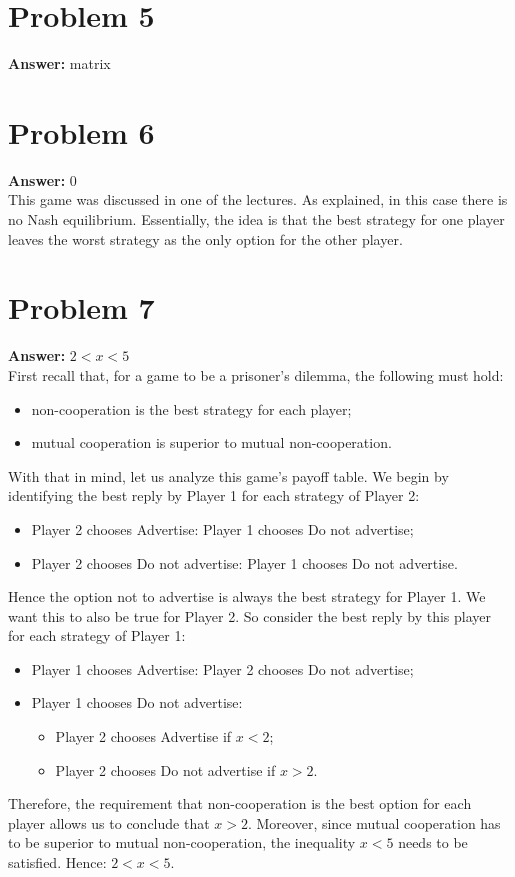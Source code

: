 \documentclass[11pt]{article}
\begin{document}
\section*{Problem 5}
\label{sec:org3917fc6}

\textbf{Answer:} matrix
\section*{Problem 6}
\label{sec:orgbb66c9e}

\textbf{Answer:} 0\\

This game was discussed in one of the lectures. As explained, in this case there
is no Nash equilibrium. Essentially, the idea is that the best strategy for one
player leaves the worst strategy as the only option for the other player.
\section*{Problem 7}
\label{sec:org84bb9a9}

\textbf{Answer:} \(2<x<5\)\\

First recall that, for a game to be a prisoner's dilemma, the following must
hold:
\begin{itemize}
\item non-cooperation is the best strategy for each player;
\item mutual cooperation is superior to mutual non-cooperation.
\end{itemize}
With that in mind, let us analyze this game's payoff table. We begin by
identifying the best reply by Player 1 for each strategy of Player 2:
\begin{itemize}
\item Player 2 chooses Advertise: Player 1 chooses Do not advertise;
\item Player 2 chooses Do not advertise: Player 1 chooses Do not advertise.
\end{itemize}
Hence the option not to advertise is always the best strategy for Player 1. We
want this to also be true for Player 2. So consider the best reply by this
player for each strategy of Player 1:
\begin{itemize}
\item Player 1 chooses Advertise: Player 2 chooses Do not advertise;
\item Player 1 chooses Do not advertise:
\begin{itemize}
\item Player 2 chooses Advertise if \(x<2\);
\item Player 2 chooses Do not advertise if \(x>2\).
\end{itemize}
\end{itemize}
Therefore, the requirement that non-cooperation is the best option for each
player allows us to conclude that \(x>2\). Moreover, since mutual cooperation
has to be superior to mutual non-cooperation, the inequality \(x<5\) needs to
be satisfied. Hence: \(2<x<5\).
\end{document}
